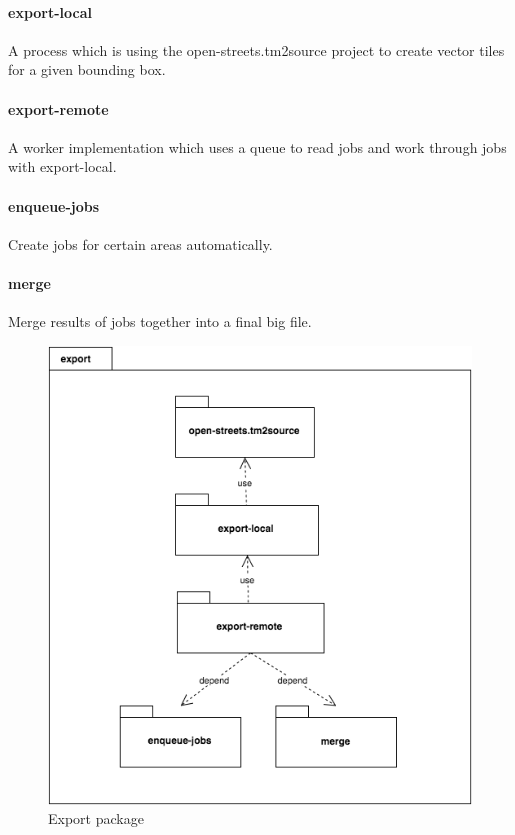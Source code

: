 \paragraph{export-local}
A process which is using the open-streets.tm2source project to create vector tiles for a
given bounding box.

\paragraph{export-remote}
A worker implementation which uses a queue to read jobs and work through jobs with
export-local.

\paragraph{enqueue-jobs}
Create jobs for certain areas automatically.

\paragraph{merge}
Merge results of jobs together into a final big file.

\begin{figure}[h]
  \includegraphics[scale=0.6]{images/export_package.png}
  \caption{Export package}
\end{figure}

